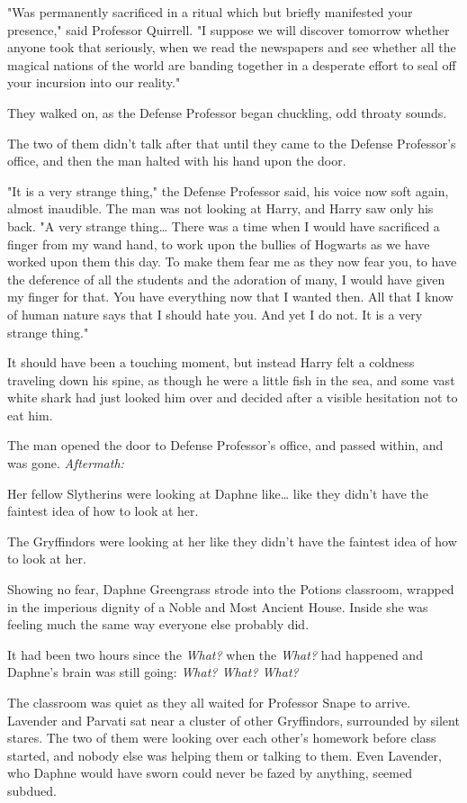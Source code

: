 "Was permanently sacrificed in a ritual which but briefly manifested your 
presence," said Professor Quirrell. "I suppose we will discover tomorrow 
whether anyone took that seriously, when we read the newspapers and see whether 
all the magical nations of the world are banding together in a desperate effort 
to seal off your incursion into our reality."

They walked on, as the Defense Professor began chuckling, odd throaty sounds.

The two of them didn't talk after that until they came to the Defense 
Professor's office, and then the man halted with his hand upon the door.

"It is a very strange thing," the Defense Professor said, his voice now soft 
again, almost inaudible. The man was not looking at Harry, and Harry saw only 
his back. "A very strange thing{\ldots} There was a time when I would have 
sacrificed a finger from my wand hand, to work upon the bullies of Hogwarts as 
we have worked upon them this day. To make them fear me as they now fear you, 
to have the deference of all the students and the adoration of many, I would 
have given my finger for that. You have everything now that I wanted then. All 
that I know of human nature says that I should hate you. And yet I do not. It 
is a very strange thing."

It should have been a touching moment, but instead Harry felt a coldness 
traveling down his spine, as though he were a little fish in the sea, and some 
vast white shark had just looked him over and decided after a visible 
hesitation not to eat him.

The man opened the door to Defense Professor's office, and passed within, and 
was gone.
\sbreak
\emph{Aftermath:}

Her fellow Slytherins were looking at Daphne like{\ldots} like they didn't have 
the faintest idea of how to look at her.

The Gryffindors were looking at her like they didn't have the faintest idea of 
how to look at her.

Showing no fear, Daphne Greengrass strode into the Potions classroom, wrapped 
in the imperious dignity of a Noble and Most Ancient House. Inside she was 
feeling much the same way everyone else probably did.

It had been two hours since the \emph{What?} when the \emph{What?} had happened 
and Daphne's brain was still going: \emph{What? What? What?}

The classroom was quiet as they all waited for Professor Snape to arrive. 
Lavender and Parvati sat near a cluster of other Gryffindors, surrounded by 
silent stares. The two of them were looking over each other's homework before 
class started, and nobody else was helping them or talking to them. Even 
Lavender, who Daphne would have sworn could never be fazed by anything, seemed 
subdued.

